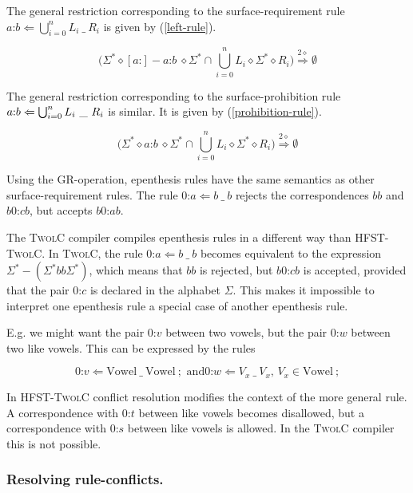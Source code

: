 \documentclass[a4paper]{article}
\begin{document}
The general restriction corresponding to the surface-requirement rule
$a\text{:}b \Leftarrow \bigcup_{i=0}^n L_i\ \_\ R_i$ is given by
(\ref{left-rule}).

\begin{equation}
  \label{left-rule}
  \Big( \Sigma^* \diamond [a\text{:}] - a\text{:}b\ \diamond\Sigma^*
  \cap \bigcup_{i=0}^n L_i\diamond\Sigma^*\diamond R_i \Big)
  \overset{2\diamond}{\Rightarrow} \emptyset
\end{equation}

The general restriction corresponding to the surface-prohibition rule
$a\text{:}b \/\Leftarrow \bigcup_{i=0}^n L_i\ \_\ R_i$ is similar. It
is given by (\ref{prohibition-rule}).

\begin{equation}
  \label{prohibition-rule}
  \Big( \Sigma^* \diamond a\text{:}b\ \diamond\Sigma^* \cap
  \bigcup_{i=0}^n L_i\diamond\Sigma^*\diamond R_i \Big)
  \overset{2\diamond}{\Rightarrow} \emptyset
\end{equation}

Using the GR-operation, epenthesis rules have the same semantics as
other surface-requirement rules. The rule $0\text{:}a \Leftarrow b\
\_\ b$ rejects the correspondences $bb$ and $b0\text{:}cb$, but accepts
$b0\text{:}ab$.

The \textsc{TwolC} compiler compiles epenthesis rules in a different
way than \textsc{HFST-TwolC}. In \textsc{TwolC}, the rule $0\text{:}a
\Leftarrow b\ \_\ b$ becomes equivalent to the expression $\Sigma^* -
( \Sigma^* b b\Sigma^*)$, which means that $bb$ is rejected, but
$b0\text{:}cb$ is accepted, provided that the pair $0\text{:}c$ is
declared in the alphabet $\Sigma$. This makes it impossible to
interpret one epenthesis rule a special case of another epenthesis
rule.

E.g. we might want the pair $0\text{:}v$ between two vowels, but the pair
$0\text{:}w$ between two like vowels. This can be expressed by the rules

$$0\text{:}v \Leftarrow \text{Vowel}\ \_\ \text{Vowel}\ ;\text{ and
}0\text{:}w \Leftarrow V_x\ \_\ V_x\text{, }V_x \in \text{Vowel}\ ;$$

In \textsc{HFST-TwolC} conflict resolution modifies the context of the
more general rule. A correspondence with $0\text{:}t$ between like
vowels becomes disallowed, but a correspondence with $0\text{:}s$
between like vowels is allowed. In the \textsc{TwolC} compiler this is
not possible.
 
\subsubsection{Resolving rule-conflicts.}
\label{twolc-conflict-resolution}
\end{document}

